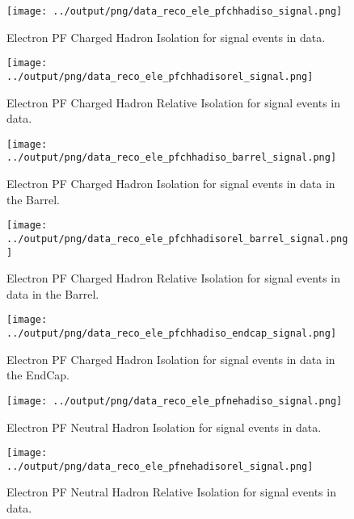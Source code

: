 \documentclass[11pt]{book}
\begin{document}
\begin{figure}[htb]
\centering
\texttt{[image: ../output/png/data\_reco\_ele\_pfchhadiso\_signal.png]}
\caption{Electron PF Charged Hadron Isolation for signal events in data.}
\label{fig:data_ele_pfchhadiso_signal}
\end{figure}

\begin{figure}[htb]
\centering
\texttt{[image: ../output/png/data\_reco\_ele\_pfchhadisorel\_signal.png]}
\caption{Electron PF Charged Hadron Relative Isolation for signal events in data.}
\label{fig:data_ele_pfchhadisorel_signal}
\end{figure}

\begin{figure}[htb]
\centering
\texttt{[image: ../output/png/data\_reco\_ele\_pfchhadiso\_barrel\_signal.png]}
\caption{Electron PF Charged Hadron Isolation for signal events in data in the Barrel.}
\label{fig:data_ele_pfchhadiso_barrel_signal}
\end{figure}

\begin{figure}[htb]
\centering
\texttt{[image: ../output/png/data\_reco\_ele\_pfchhadisorel\_barrel\_signal.png]}
\caption{Electron PF Charged Hadron Relative Isolation for signal events in data in the Barrel.}
\label{fig:data_ele_pfchhadisorel_barrel_signal}
\end{figure}

\begin{figure}[htb]
\centering
\texttt{[image: ../output/png/data\_reco\_ele\_pfchhadiso\_endcap\_signal.png]}
\caption{Electron PF Charged Hadron Isolation for signal events in data in the EndCap.}
\label{fig:data_ele_pfchhadiso_endcap_signal}
\end{figure}

\begin{figure}[htb]
\centering
\texttt{[image: ../output/png/data\_reco\_ele\_pfnehadiso\_signal.png]}
\caption{Electron PF Neutral Hadron Isolation for signal events in data.}
\label{fig:data_ele_pfnehadiso_signal}
\end{figure}

\begin{figure}[htb]
\centering
\texttt{[image: ../output/png/data\_reco\_ele\_pfnehadisorel\_signal.png]}
\caption{Electron PF Neutral Hadron Relative Isolation for signal events in data.}
\label{fig:data_ele_pfnehadisorel_signal}
\end{figure}
\end{document}
